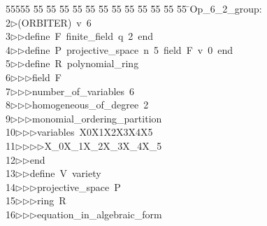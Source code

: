 %
%
\begin{tabbing}
55555 \= 55 \= 55 \= 55 \= 55 \= 55 \= 55 \= 55 \= 55 \= 55 \= 55 \= 55 \= 55 \= \>Op\_6\_2\_group:\\[0pt]
2\>$\triangleright$\>(ORBITER)\ v\ 6\ \\[0pt]
3\>$\triangleright$\>$\triangleright$\>define\ F\ finite\_field\ q\ 2\ end\ \\[0pt]
4\>$\triangleright$\>$\triangleright$\>define\ P\ projective\_space\ n\ 5\ field\ F\ v\ 0\ end\ \\[0pt]
5\>$\triangleright$\>$\triangleright$\>define\ R\ polynomial\_ring\ \\[0pt]
6\>$\triangleright$\>$\triangleright$\>$\triangleright$\>field\ F\ \\[0pt]
7\>$\triangleright$\>$\triangleright$\>$\triangleright$\>number\_of\_variables\ 6\ \\[0pt]
8\>$\triangleright$\>$\triangleright$\>$\triangleright$\>homogeneous\_of\_degree\ 2\ \\[0pt]
9\>$\triangleright$\>$\triangleright$\>$\triangleright$\>monomial\_ordering\_partition\ \\[0pt]
10\>$\triangleright$\>$\triangleright$\>$\triangleright$\>variables\ X0X1X2X3X4X5\ \\[0pt]
11\>$\triangleright$\>$\triangleright$\>$\triangleright$\>$\triangleright$\>X\_0X\_1X\_2X\_3X\_4X\_5\ \\[0pt]
12\>$\triangleright$\>$\triangleright$\>end\ \\[0pt]
13\>$\triangleright$\>$\triangleright$\>define\ V\ variety\ \\[0pt]
14\>$\triangleright$\>$\triangleright$\>$\triangleright$\>projective\_space\ P\ \\[0pt]
15\>$\triangleright$\>$\triangleright$\>$\triangleright$\>ring\ R\ \\[0pt]
16\>$\triangleright$\>$\triangleright$\>$\triangleright$\>equation\_in\_algebraic\_form\ \\[0pt]

\end{tabbing}
